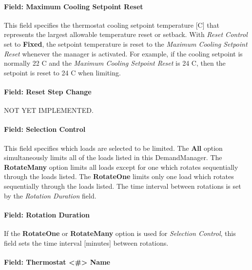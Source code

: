 \paragraph{Field: Maximum Cooling Setpoint Reset}\label{field-maximum-cooling-setpoint-reset}

This field specifies the thermostat cooling setpoint temperature {[}C{]} that represents the largest allowable temperature reset or setback. With \emph{Reset Control} set to \textbf{Fixed}, the setpoint temperature is reset to the \emph{Maximum Cooling Setpoint Reset} whenever the manager is activated. For example, if the cooling setpoint is normally 22 C and the \emph{Maximum Cooling Setpoint Reset} is 24 C, then the setpoint is reset to 24 C when limiting.

\paragraph{Field: Reset Step Change}\label{field-reset-step-change}

NOT YET IMPLEMENTED.

\paragraph{Field: Selection Control}\label{field-selection-control-3}

This field specifies which loads are selected to be limited. The \textbf{All} option simultaneously limits all of the loads listed in this DemandManager. The \textbf{RotateMany} option limits all loads except for one which rotates sequentially through the loads listed. The \textbf{RotateOne} limits only one load which rotates sequentially through the loads listed. The time interval between rotations is set by the \emph{Rotation Duration} field.

\paragraph{Field: Rotation Duration}\label{field-rotation-duration-3}

If the \textbf{RotateOne} or \textbf{RotateMany} option is used for \emph{Selection Control}, this field sets the time interval {[}minutes{]} between rotations.

\paragraph{Field: Thermostat \textless{}\#\textgreater{} Name}\label{field-thermostat-1-10-name}

